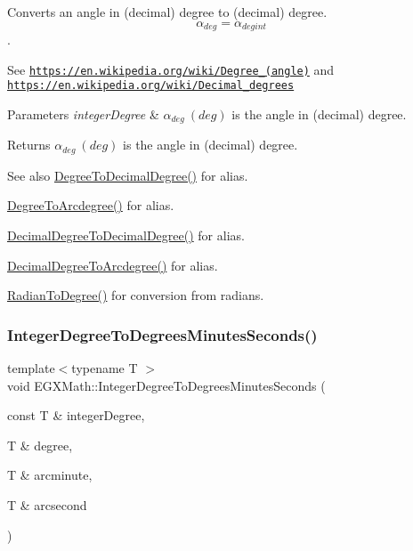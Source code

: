 Converts an angle in (decimal) degree to (decimal) degree. \[\alpha_{deg}=\alpha_{deg int}\]. 

See \href{https://en.wikipedia.org/wiki/Degree_(angle)}{\tt https\+://en.\+wikipedia.\+org/wiki/\+Degree\+\_\+(angle)} and \href{https://en.wikipedia.org/wiki/Decimal_degrees}{\tt https\+://en.\+wikipedia.\+org/wiki/\+Decimal\+\_\+degrees} 
\begin{DoxyParams}{Parameters}
{\em integer\+Degree} & $\alpha_{deg}\ (deg)$ is the angle in (decimal) degree. \\
\hline
\end{DoxyParams}
\begin{DoxyReturn}{Returns}
$\alpha_{deg}\ (deg)$ is the angle in (decimal) degree. 
\end{DoxyReturn}
\begin{DoxySeeAlso}{See also}
\mbox{\hyperlink{group___e_g_x_math-_angle_conversions-_degree_ga568afc1d436d425bf5d4edea584aee08}{Degree\+To\+Decimal\+Degree()}} for alias. 

\mbox{\hyperlink{group___e_g_x_math-_angle_conversions-_degree_gac1b5f3b68f66c77a6df4ceef842c9b19}{Degree\+To\+Arcdegree()}} for alias. 

\mbox{\hyperlink{group___e_g_x_math-_angle_conversions-_decimal_degree_gafccf9cd779903872887978ab9d79661f}{Decimal\+Degree\+To\+Decimal\+Degree()}} for alias. 

\mbox{\hyperlink{group___e_g_x_math-_angle_conversions-_decimal_degree_gacdd463fcabffeb598ebda65b012ce743}{Decimal\+Degree\+To\+Arcdegree()}} for alias. 

\mbox{\hyperlink{group___e_g_x_math-_angle_conversions-_radian_ga25bbce6cdc1c3621f2a158d320e3bc45}{Radian\+To\+Degree()}} for conversion from radians. 
\end{DoxySeeAlso}
\mbox{\label{group___e_g_x_math-_angle_conversions-_integer_degree_ga204317877546ea6bbafe5ff558f55a16}} 
\subsubsection{\texorpdfstring{Integer\+Degree\+To\+Degrees\+Minutes\+Seconds()}{IntegerDegreeToDegreesMinutesSeconds()}}
{\footnotesize\ttfamily template$<$typename T $>$ \\
void E\+G\+X\+Math\+::\+Integer\+Degree\+To\+Degrees\+Minutes\+Seconds (\begin{DoxyParamCaption}\item[{const T \&}]{integer\+Degree,  }\item[{T \&}]{degree,  }\item[{T \&}]{arcminute,  }\item[{T \&}]{arcsecond }\end{DoxyParamCaption})}



